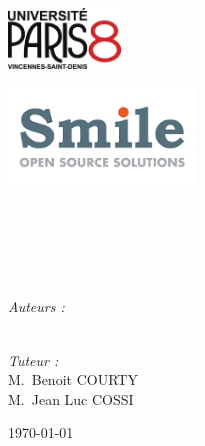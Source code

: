 \begin{titlepage}

\begin{center}

\begin{minipage}[t]{0.48\textwidth}
  \begin{flushleft}
   \includegraphics [width=30mm]{figures/logop8.jpg} \\[0.5cm]
    \begin{spacing}{1.5}
    \end{spacing}
  \end{flushleft}
\end{minipage}
\begin{minipage}[t]{0.48\textwidth}
  \begin{flushright}
    \includegraphics [width=50mm]{figures/logo_Smile.png} \\[0.5cm]
  \end{flushright}
\end{minipage} \\[1.5cm]

\HRule \\[0.4cm]
{\huge \bfseries \reporttitle}\\[0.4cm]
\HRule \\[1.5cm]

\begin{minipage}[b]{0.3\textwidth}
  \begin{flushleft} \large
    \emph{Auteurs :}\\
    \reportauthora\\
  \end{flushleft}
\end{minipage}
\begin{minipage}[b]{0.6\textwidth}
  \begin{flushright} \large
    \emph{Tuteur :} \\
    M.~Benoit \textsc{COURTY} \\
	M.~Jean Luc \textsc{COSSI} \\
   \end{flushright}
\end{minipage}

\vfill

{\large \today}

\end{center}

\end{titlepage}
